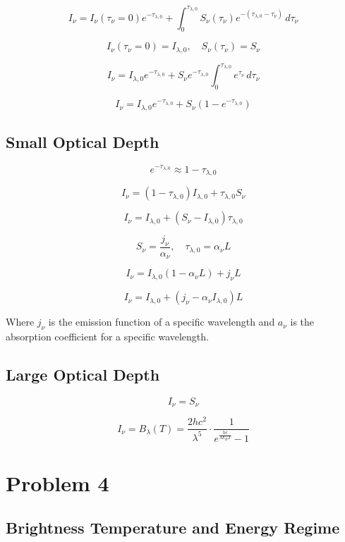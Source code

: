 \documentclass[12pt]{article}
\begin{document}
\[
    I_\nu = I_\nu(\tau_\nu=0) e^{-\tau_{\lambda,0}} + \int_{0}^{\tau_{\lambda,0}} S_\nu(\tau_\nu) e^{-(\tau_{\lambda,0} - \tau_\nu)} \, d\tau_\nu
\]

\[
    I_\nu(\tau_\nu=0) = I_{\lambda,0},\quad S_\nu(\tau_\nu) = S_\nu
\]

\[
    I_\nu = I_{\lambda,0} e^{-\tau_{\lambda,0}} + S_\nu e^{-\tau_{\lambda,0}} \int_{0}^{\tau_{\lambda,0}} e^{\tau_\nu} \, d\tau_\nu
\]

\[
    I_\nu = I_{\lambda,0} e^{-\tau_{\lambda,0}} + S_\nu (1 - e^{-\tau_{\lambda,0}})
\]

\subsection{Small Optical Depth}

\[
    e^{-\tau_{\lambda,0}} \approx 1 - \tau_{\lambda,0}
\]

\[
    I_\nu = (1 - \tau_{\lambda,0})I_{\lambda,0} + \tau_{\lambda,0}S_\nu
\]

\[
    I_\nu = I_{\lambda,0} + (S_\nu - I_{\lambda,0})\tau_{\lambda,0}
\]

\[
    S_\nu = \frac{j_\nu}{\alpha_\nu},\quad \tau_{\lambda,0} = \alpha_\nu L
\]

\[
    I_\nu = I_{\lambda,0} (1 - \alpha_\nu L) + j_\nu L
\]

\[
    I_\nu = I_{\lambda,0} + (j_\nu - \alpha_\nu I_{\lambda,0})L
\]

Where $j_\nu$ is the emission function of a specific wavelength and $a_\nu$ is the absorption coefficient for a specific wavelength.

\subsection{Large Optical Depth}

\[
    I_\nu = S_\nu
\]

\[
    I_\nu = B_\lambda(T) = \frac{2 h c^2}{\lambda^5} \cdot \frac{1}{e^{\frac{h c}{\lambda k_B T}} - 1}
\]

\newpage

\section{Problem 4}

\subsection{Brightness Temperature and Energy Regime}
\end{document}
